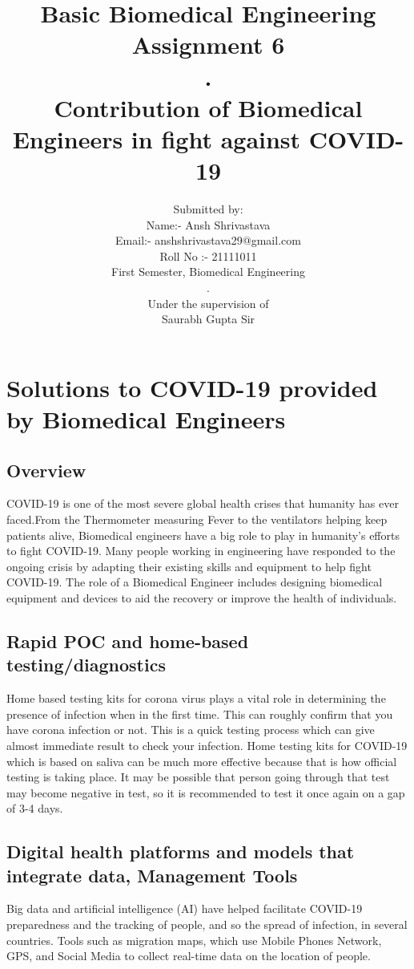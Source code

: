 \documentclass[12pt]{article}
\title{Basic Biomedical Engineering\\Assignment 6\\.\\Contribution of Biomedical Engineers in fight against COVID-19}
\author{Submitted by: \\Name:- Ansh Shrivastava\\Email:- anshshrivastava29@gmail.com\\Roll No :- 21111011\\First Semester, Biomedical Engineering\\.\\Under the supervision of\\Saurabh Gupta Sir}
\begin{document}
\maketitle
\clearpage
\tableofcontents
\clearpage

\section{Solutions to COVID-19 provided by Biomedical Engineers}
\subsection{Overview}
COVID-19 is one of the most severe global health crises that humanity has ever faced.From the Thermometer measuring Fever to the ventilators helping keep patients alive, Biomedical engineers have a big role to play in humanity's efforts to fight COVID-19. 
Many people working in engineering have responded to the ongoing crisis by adapting their existing skills and equipment to help fight COVID-19. The role of a Biomedical Engineer includes designing biomedical equipment and devices to aid the recovery or improve the health of individuals.
 
\subsection{Rapid POC and home-based testing/diagnostics}
Home based testing kits for corona virus plays a vital role in determining the presence of infection when in the first time. This can roughly confirm that you have corona infection or not. This is a quick testing process which can give almost immediate result to check your infection.
Home testing kits for COVID-19 which is based on saliva can be much more effective because that is how official testing is taking place. It may be possible that person going through that test may become negative in test, so it is recommended to test it once again on a gap of 3-4 days.

\subsection{Digital health platforms and models that integrate data, Management Tools}
Big data and artificial intelligence (AI) have helped 
facilitate COVID-19 preparedness and the tracking of 
people, and so the spread of infection, in several 
countries. Tools such as migration maps, which use 
Mobile Phones Network, GPS, and Social 
Media to collect real-time data on the location of people.
\end{document}

